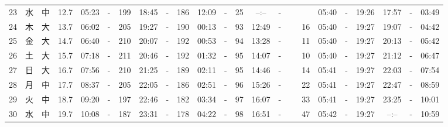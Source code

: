 \documentclass[12pt,a4j]{jsarticle}
\begin{document}
\begin{table}[htbp]
\begin{center}
{\begin{tabular}{|rc|cr|ccrccr|ccrccr|ccc|ccc|}
23 & 水 & 中 & 12.7 &  05:23 &-& 199 &  18:45 &-& 186 &  12:09 &-&  25 &  --:-- &-&~~~~~ & 05:40 & -& 19:26 & 17:57 & -& 03:49 \\
24 & 木 & 大 & 13.7 &  06:02 &-& 205 &  19:27 &-& 190 &  00:13 &-&  93 &  12:49 &-&  16 & 05:40 & -& 19:27 & 19:07 & -& 04:42 \\
25 & 金 & 大 & 14.7 &  06:40 &-& 210 &  20:07 &-& 192 &  00:53 &-&  94 &  13:28 &-&  11 & 05:40 & -& 19:27 & 20:13 & -& 05:42 \\
26 & 土 & 大 & 15.7 &  07:18 &-& 211 &  20:46 &-& 192 &  01:32 &-&  95 &  14:07 &-&  10 & 05:40 & -& 19:27 & 21:12 & -& 06:47 \\
27 & 日 & 大 & 16.7 &  07:56 &-& 210 &  21:25 &-& 189 &  02:11 &-&  95 &  14:46 &-&  14 & 05:41 & -& 19:27 & 22:03 & -& 07:54 \\
28 & 月 & 中 & 17.7 &  08:37 &-& 205 &  22:05 &-& 186 &  02:51 &-&  96 &  15:26 &-&  22 & 05:41 & -& 19:27 & 22:47 & -& 08:59 \\
29 & 火 & 中 & 18.7 &  09:20 &-& 197 &  22:46 &-& 182 &  03:34 &-&  97 &  16:07 &-&  33 & 05:41 & -& 19:27 & 23:25 & -& 10:01 \\
30 & 水 & 中 & 19.7 &  10:08 &-& 187 &  23:31 &-& 178 &  04:22 &-&  98 &  16:51 &-&  47 & 05:42 & -& 19:27 & --:-- & -& 10:59 \\
   \hline
   \end{tabular}}
   \end{center}
\end{table}
\newpage
\end{document}
